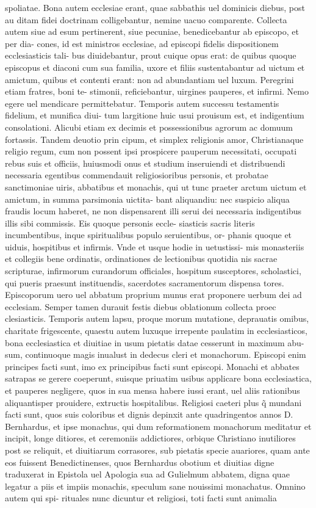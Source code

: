 \documentclass{article}
\begin{document}
\begin{pages}
\marginpar{[ p.516 ]}\pstart spoliatae. Bona autem ecclesiae erant, quae sabbathis uel dominicis diebus, post au ditam fidei doctrinam colligebantur, nemine uacuo comparente. Collecta autem siue ad esum pertinerent, siue pecuniae, benedicebantur ab episcopo, et per dia- cones, id est ministros ecclesiae, ad episcopi fidelis dispositionem ecclesiasticis tali- bus diuidebantur, prout cuique opus erat: de quibus quoque episcopus et diaconi cum sua familia, uxore et filiis sustentabantur ad uictum et amictum, quibus et contenti erant: non ad abundantiam uel luxum. Peregrini etiam fratres, boni te- stimonii, reficiebantur, uirgines pauperes, et infirmi. Nemo egere uel mendicare permittebatur. Temporis autem successu testamentis fidelium, et munifica diui- tum largitione huic usui prouisum est, et indigentium consolationi. Alicubi etiam ex decimis et possessionibus agrorum ac domuum fortassis. Tandem deuotio prin cipum, et simplex religionis amor, Christianaque religio regum, cum non possent ipsi prospicere pauperum necessitati, occupati rebus suis et officiis, huiusmodi onus et studium inseruiendi et distribuendi necessaria egentibus commendauit religiosioribus personis, et probatae sanctimoniae uiris, abbatibus et monachis, qui ut tunc praeter arctum uictum et amictum, in summa parsimonia uictita- bant aliquandiu: nec suspicio aliqua fraudis locum haberet, ne non dispensarent illi serui dei necessaria indigentibus illis sibi commissis. Eis quoque personis eccle- siasticis sacris literis incumbentibus, inque spiritualibus populo seruientibus, or- phanis quoque et uiduis, hospitibus et infirmis. Vnde et usque hodie in uetustissi- mis monasteriis et collegiis bene ordinatis, ordinationes de lectionibus quotidia nis sacrae scripturae, infirmorum curandorum officiales, hospitum susceptores, scholastici, qui pueris praesunt instituendis, sacerdotes sacramentorum dispensa tores. Episcoporum uero uel abbatum proprium munus erat proponere uerbum dei ad ecclesiam. Semper tamen durauit festis diebus oblationum collecta proec clesiasticis. Temporis autem lapsu, proque morum mutatione, deprauatis omibus, charitate frigescente, quaestu autem luxuque irrepente paulatim in ecclesiasticos, bona ecclesiastica et diuitiae in usum pietatis datae cesserunt in maximum abu- sum, continuoque magis inualust in dedecus cleri et monachorum. Episcopi enim principes facti sunt, imo ex principibus facti sunt episcopi. Monachi et abbates satrapas se gerere coeperunt, suisque priuatim usibus applicare bona ecclesiastica, et pauperes negligere, quos in sua mensa habere iussi erant, uel aliis rationibus aliquantisper prouidere, extructis hospitalibus. Religiosi caeteri plus q̃ mundani facti sunt, quos suis coloribus et dignis depinxit ante quadringentos annos D. Bernhardus, et ipse monachus, qui dum reformationem monachorum meditatur et incipit, longe ditiores, et ceremoniis addictiores, orbique Christiano inutiliores post se reliquit, et diuitiarum corrasores, sub pietatis specie auariores, quam ante eos fuissent Benedictinenses, quos Bernhardus obotium et diuitias digne traduxerat in Epistola uel Apologia sua ad Gulielmum abbatem, digna quae legatur a piis et impiis monachis, speculum sane nouissimi monachatus. Omnino autem qui spi- rituales nunc dicuntur et religiosi, toti facti sunt animalia 
\end{pages}
\end{document}
